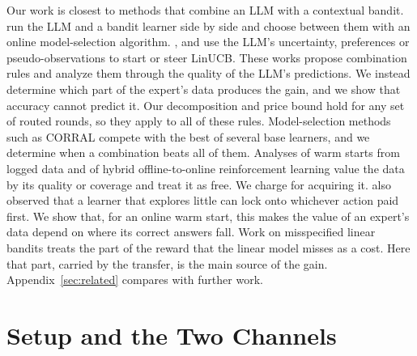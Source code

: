 \documentclass[anon]{alt2027} %
\newif\ifrevmarks\revmarkstrue
\newenvironment{revised}{\ifrevmarks\color{revcolor}\fi}{}
\begin{document}
\begin{revised}
Our work is closest to methods that combine an LLM with a contextual bandit.
\citet{chen2024llmdecision} run the LLM and a bandit learner side by side
and choose between them with an online model-selection algorithm.
\citet{huangcontextual}, \citet{jumpstart2026} and \citet{calibgated2026}
use the LLM's uncertainty, preferences or pseudo-observations to start or
steer LinUCB. These works propose combination rules and analyze them through
the quality of the LLM's predictions. We instead determine which part of the
expert's data produces the gain, and we show that accuracy cannot predict
it. Our decomposition and price bound hold for any set of routed rounds, so
they apply to all of these rules. Model-selection methods such as CORRAL
\citep{agarwal2017corralling} compete with the best of several base
learners, and we determine when a combination beats all of them. Analyses of
warm starts from logged data \citep{zhang2019warm} and of
hybrid offline-to-online reinforcement learning
\citep{song2022hybrid,wagenmaker2023leveraging} value the data by its
quality or coverage and treat it as free. We charge for acquiring it.
\citet{bastani2021mostly} also observed that a learner that explores little
can lock onto whichever action paid first. We show that, for an online warm
start, this makes the value of an expert's data depend on where its correct
answers fall. Work on misspecified linear bandits
\citep{ghosh2017misspecified,lattimore2020learning,foster2020adapting}
treats the part of the reward that the linear model misses as a cost. Here
that part, carried by the transfer, is the main source of the gain.
Appendix~\ref{sec:related} compares with further work.
\end{revised}

\section{Setup and the Two Channels}
\label{sec:setup}
\label{sec:preliminaries}
\end{document}
